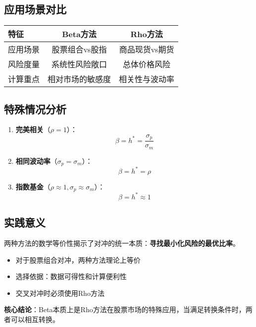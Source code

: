 \subsection{应用场景对比}

\begin{table}[h]
\centering
\begin{tabular}{|l|c|c|}
\hline
\textbf{特征} & \textbf{Beta方法} & \textbf{Rho方法} \\
\hline
应用场景 & 股票组合vs股指 & 商品现货vs期货 \\
风险度量 & 系统性风险敞口 & 总体价格风险 \\
计算重点 & 相对市场的敏感度 & 相关性与波动率 \\
\hline
\end{tabular}
\end{table}

\subsection{特殊情况分析}

\begin{enumerate}
    \item \textbf{完美相关}（$\rho = 1$）：
    \begin{equation}
    \beta = h^* = \frac{\sigma_p}{\sigma_m}
    \end{equation}
    
    \item \textbf{相同波动率}（$\sigma_p = \sigma_m$）：
    \begin{equation}
    \beta = h^* = \rho
    \end{equation}
    
    \item \textbf{指数基金}（$\rho \approx 1, \sigma_p \approx \sigma_m$）：
    \begin{equation}
    \beta = h^* \approx 1
    \end{equation}
\end{enumerate}

\subsection{实践意义}

两种方法的数学等价性揭示了对冲的统一本质：\textbf{寻找最小化风险的最优比率}。

\begin{itemize}
    \item 对于股票组合对冲，两种方法理论上等价
    \item 选择依据：数据可得性和计算便利性
    \item 交叉对冲时必须使用Rho方法
\end{itemize}

\textbf{核心结论}：Beta本质上是Rho方法在股票市场的特殊应用，当满足转换条件时，两者可以相互转换。




